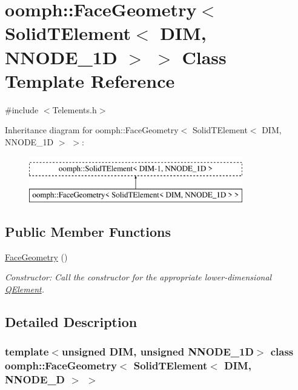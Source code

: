 \hypertarget{classoomph_1_1FaceGeometry_3_01SolidTElement_3_01DIM_00_01NNODE__1D_01_4_01_4}{}\section{oomph\+:\+:Face\+Geometry$<$ Solid\+T\+Element$<$ D\+IM, N\+N\+O\+D\+E\+\_\+1D $>$ $>$ Class Template Reference}
\label{classoomph_1_1FaceGeometry_3_01SolidTElement_3_01DIM_00_01NNODE__1D_01_4_01_4}


{\ttfamily \#include $<$Telements.\+h$>$}

Inheritance diagram for oomph\+:\+:Face\+Geometry$<$ Solid\+T\+Element$<$ D\+IM, N\+N\+O\+D\+E\+\_\+1D $>$ $>$\+:\begin{figure}[H]
\begin{center}
\leavevmode
\includegraphics[height=2.000000cm]{classoomph_1_1FaceGeometry_3_01SolidTElement_3_01DIM_00_01NNODE__1D_01_4_01_4}
\end{center}
\end{figure}
\subsection*{Public Member Functions}
\begin{DoxyCompactItemize}
\item 
\hyperlink{classoomph_1_1FaceGeometry_3_01SolidTElement_3_01DIM_00_01NNODE__1D_01_4_01_4_a423be6d59358b48a7b173b5ee2cf2634}{Face\+Geometry} ()
\begin{DoxyCompactList}\small\item\em Constructor\+: Call the constructor for the appropriate lower-\/dimensional \hyperlink{classoomph_1_1QElement}{Q\+Element}. \end{DoxyCompactList}\end{DoxyCompactItemize}


\subsection{Detailed Description}
\subsubsection*{template$<$unsigned D\+IM, unsigned N\+N\+O\+D\+E\+\_\+1D$>$\newline
class oomph\+::\+Face\+Geometry$<$ Solid\+T\+Element$<$ D\+I\+M, N\+N\+O\+D\+E\+\_\+D $>$ $>$}

